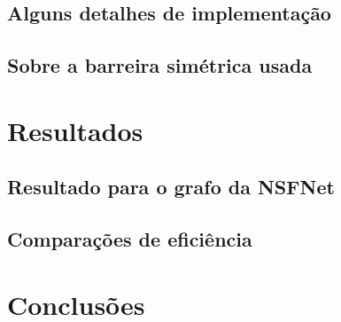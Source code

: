 \documentclass[a4paper,11pt]{article}
\begin{document}
  \subsection{Alguns detalhes de implementação}

  \subsection{Sobre a barreira simétrica usada}

\section{Resultados}

  \subsection{Resultado para o grafo da NSFNet}

  \subsection{Comparações de eficiência}

\section{Conclusões}
\end{document}
